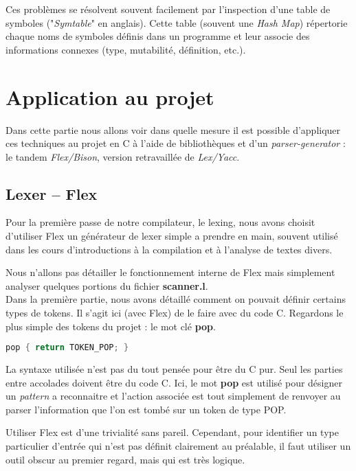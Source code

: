 \documentclass[14pt,a4paper]{article}
\begin{document}
	Ces problèmes se résolvent souvent facilement par l'inspection d'une table de symboles ("\textit{Symtable}" en anglais). Cette table (souvent une \textit{Hash Map}) répertorie chaque noms de symboles définis dans un programme et leur associe des informations connexes (type, mutabilité, définition, etc.).
	
	\section{Application au projet}
	
	Dans cette partie nous allons voir dans quelle mesure il est possible d'appliquer ces techniques au projet en C à l'aide de bibliothèques et d'un \textit{parser-generator} : le tandem \textit{Flex/Bison}, version retravaillée de \textit{Lex/Yacc}.
	
	\subsection{Lexer -- Flex}
	
	Pour la première passe de notre compilateur, le lexing, nous avons choisit d'utiliser Flex un générateur de lexer simple a prendre en main, souvent utilisé dans les cours d'introductions à la compilation et à l'analyse de textes divers.
	
	Nous n'allons pas détailler le fonctionnement interne de Flex mais simplement analyser quelques portions du fichier \textbf{scanner.l}.\\
	
	Dans la première partie, nous avons détaillé comment on pouvait définir certains types de tokens. Il s'agit ici (avec Flex) de le faire avec du code C. Regardons le plus simple des tokens du projet : le mot clé \textbf{pop}.
	
	\begin{lstlisting}[frame=simple,language=C]
pop { return TOKEN_POP; }
	\end{lstlisting}
	
	La syntaxe utilisée n'est pas du tout pensée pour être du C pur. Seul les parties entre accolades doivent être du code C. Ici, le mot \textbf{pop} est utilisé pour désigner un \textit{pattern} a reconnaitre et l'action associée est tout simplement de renvoyer au parser l'information que l'on est tombé sur un token de type POP.
	
	Utiliser Flex est d'une trivialité sans pareil. Cependant, pour identifier un type particulier d'entrée qui n'est pas définit clairement au préalable, il faut utiliser un outil obscur au premier regard, mais qui est très logique.\\
	
\end{document}

